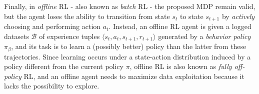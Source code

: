 Finally, in \textit{offline} RL - also known as \textit{batch} RL -
the proposed MDP remain valid, but the agent loses the ability to transition
from state $s_t$ to state $s_{t+1}$ by \textit{actively} choosing and
performing action $a_t$. Instead, an offline RL agent is given a
logged datasets $\mathcal{B}$ of experience tuples
$\langle s_t,a_t,s_{t+1},r_{t+1}\rangle$ generated by a \textit{behavior
policy} $\pi_{\beta}$, and its task is to learn a (possibly better)
policy than the latter from these trajectories.
Since learning occurs under a state-action distribution induced by a
policy different from the current policy $\pi$, offline RL is also
known as \textit{fully off-policy} RL, and an offline agent needs to
maximize data exploitation because it lacks the possibility to
explore.